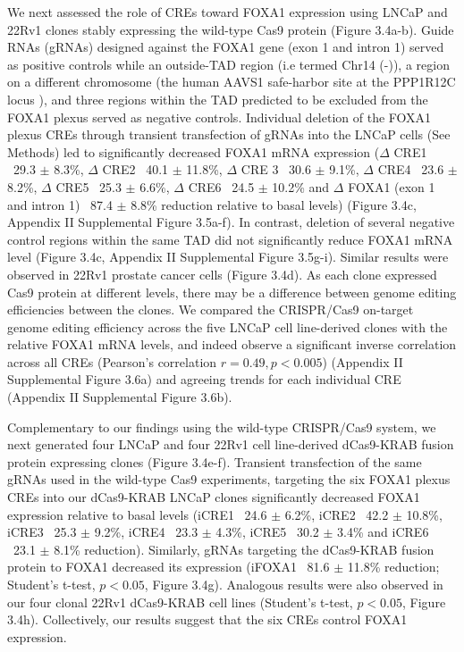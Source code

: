 We next assessed the role of CREs toward FOXA1 expression using LNCaP and 22Rv1 clones stably expressing the wild-type Cas9 protein (Figure 3.4a-b).
Guide RNAs (gRNAs) designed against the FOXA1 gene (exon 1 and intron 1) served as positive controls while an outside-TAD region (i.e termed Chr14 (-)), a region on a different chromosome (the human AAVS1 safe-harbor site at the PPP1R12C locus \cite{kronTMPRSS2ERGFusion2017,dekelverFunctionalGenomicsProteomics2010}), and three regions within the TAD predicted to be excluded from the FOXA1 plexus served as negative controls.
Individual deletion of the FOXA1 plexus CREs through transient transfection of gRNAs into the LNCaP cells (See Methods) led to significantly decreased FOXA1 mRNA expression ($\Delta$ CRE1 ~29.3 $\pm$ 8.3\%, $\Delta$ CRE2 ~40.1 $\pm$ 11.8\%, $\Delta$ CRE 3 ~30.6 $\pm$ 9.1\%, $\Delta$ CRE4 ~23.6 $\pm$ 8.2\%, $\Delta$ CRE5 ~25.3 $\pm$ 6.6\%, $\Delta$ CRE6 ~24.5 $\pm$ 10.2\% and $\Delta$ FOXA1 (exon 1 and intron 1) ~87.4 $\pm$ 8.8\% reduction relative to basal levels) (Figure 3.4c, Appendix II Supplemental Figure 3.5a-f).
In contrast, deletion of several negative control regions within the same TAD did not significantly reduce FOXA1 mRNA level (Figure 3.4c, Appendix II Supplemental Figure 3.5g-i).
Similar results were observed in 22Rv1 prostate cancer cells (Figure 3.4d).
As each clone expressed Cas9 protein at different levels, there may be a difference between genome editing efficiencies between the clones.
We compared the CRISPR/Cas9 on-target genome editing efficiency across the five LNCaP cell line-derived clones with the relative FOXA1 mRNA levels, and indeed observe a significant inverse correlation across all CREs (Pearson’s correlation $r = 0.49, p < 0.005$) (Appendix II Supplemental Figure 3.6a) and agreeing trends for each individual CRE (Appendix II Supplemental Figure 3.6b).

Complementary to our findings using the wild-type CRISPR/Cas9 system, we next generated four LNCaP and four 22Rv1 cell line-derived dCas9-KRAB fusion protein expressing clones (Figure 3.4e-f).
Transient transfection of the same gRNAs used in the wild-type Cas9 experiments, targeting the six FOXA1 plexus CREs into our dCas9-KRAB LNCaP clones significantly decreased FOXA1 expression relative to basal levels (iCRE1 ~24.6 $\pm$ 6.2\%, iCRE2 ~42.2 $\pm$ 10.8\%, iCRE3 ~25.3 $\pm$ 9.2\%, iCRE4 ~23.3 $\pm$ 4.3\%, iCRE5 ~30.2 $\pm$ 3.4\% and iCRE6 ~23.1 $\pm$ 8.1\% reduction).
Similarly, gRNAs targeting the dCas9-KRAB fusion protein to FOXA1 decreased its expression (iFOXA1 ~81.6 $\pm$ 11.8\% reduction; Student’s t-test, $p<0.05$, Figure 3.4g).
Analogous results were also observed in our four clonal 22Rv1 dCas9-KRAB cell lines (Student’s t-test, $p<0.05$, Figure 3.4h).
Collectively, our results suggest that the six CREs control FOXA1 expression.

